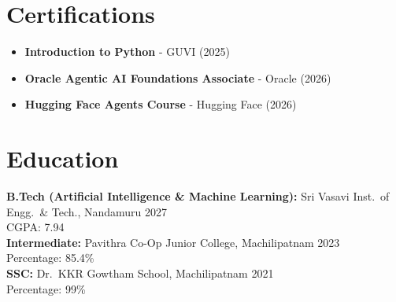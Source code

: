 \documentclass[letterpaper,11pt]{article}
\begin{document}
\section*{Certifications}
\begin{itemize}
\item \textbf{Introduction to Python} - GUVI (2025)
\item \textbf{Oracle Agentic AI Foundations Associate} - Oracle (2026)
\item \textbf{Hugging Face Agents Course} - Hugging Face (2026)
\end{itemize}

\section*{Education}
{\bfseries B.Tech (Artificial Intelligence \& Machine Learning):} Sri Vasavi Inst.\ of Engg.\ \& Tech., Nandamuru
\hfill {2027}\\
CGPA: 7.94\\[1pt]
{\bfseries Intermediate:} Pavithra Co-Op Junior College, Machilipatnam
\hfill {2023}\\
Percentage: 85.4\%\\[1pt]
{\bfseries SSC:} Dr.\ KKR Gowtham School, Machilipatnam
\hfill {2021}\\
Percentage: 99\%
\end{document}
